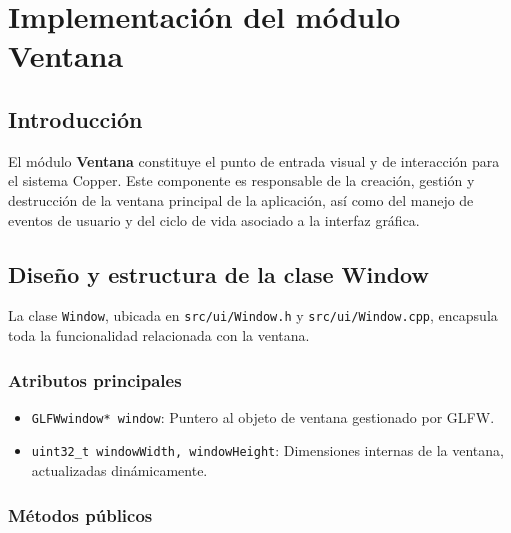 \chapter{Implementación del módulo Ventana}

\section{Introducción}

El módulo \textbf{Ventana} constituye el punto de entrada visual y de
interacción para el sistema Copper. Este componente es responsable de la
creación, gestión y destrucción de la ventana principal de la aplicación, así
como del manejo de eventos de usuario y del ciclo de vida asociado a la
interfaz gráfica.

\section{Diseño y estructura de la clase Window}

La clase \texttt{Window}, ubicada en \texttt{src/ui/Window.h} y
\texttt{src/ui/Window.cpp}, encapsula toda la funcionalidad relacionada con la
ventana.

\subsection{Atributos principales}

\begin{itemize}
    \item \texttt{GLFWwindow* window}: Puntero al objeto de ventana gestionado por GLFW.
    \item \texttt{uint32\_t windowWidth, windowHeight}: Dimensiones internas de la ventana, actualizadas dinámicamente.
\end{itemize}

\subsection{Métodos públicos}


